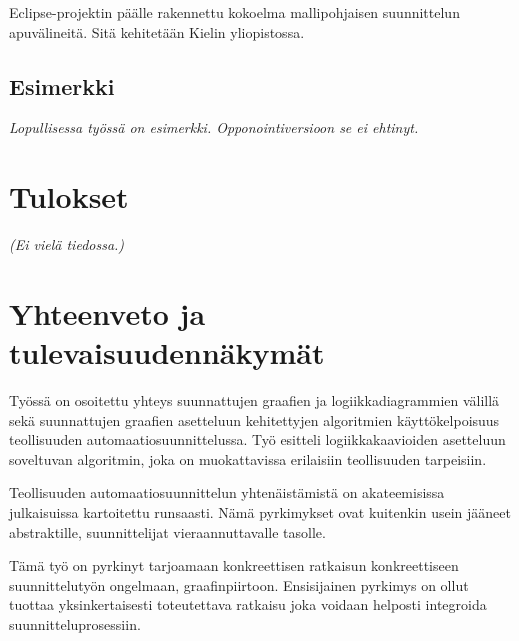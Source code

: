\documentclass[finnish,12pt]{article}
\begin{document}
Eclipse-projektin päälle rakennettu kokoelma mallipohjaisen suunnittelun apuvälineitä. Sitä kehitetään Kielin yliopistossa.

		\subsection{Esimerkki}

		\emph{Lopullisessa työssä on esimerkki. Opponointiversioon se ei ehtinyt.}







	\clearpage
	\section{Tulokset}
	
\emph{(Ei vielä tiedossa.)}

	\section{Yhteenveto ja tulevaisuudennäkymät}

Työssä on osoitettu yhteys suunnattujen graafien ja logiikkadiagrammien välillä sekä suunnattujen graafien asetteluun kehitettyjen algoritmien käyttökelpoisuus teollisuuden automaatiosuunnittelussa.
Työ esitteli logiikkakaavioiden asetteluun soveltuvan algoritmin, joka on muokattavissa erilaisiin teollisuuden tarpeisiin.

Teollisuuden automaatiosuunnittelun yhtenäistämistä on akateemisissa julkaisuissa kartoitettu runsaasti.
Nämä pyrkimykset ovat kuitenkin usein jääneet abstraktille, suunnittelijat vieraannuttavalle tasolle.

Tämä työ on pyrkinyt tarjoamaan konkreettisen ratkaisun konkreettiseen suunnittelutyön ongelmaan, graafinpiirtoon.
Ensisijainen pyrkimys on ollut tuottaa yksinkertaisesti toteutettava ratkaisu joka voidaan helposti integroida suunnitteluprosessiin.
\end{document}
